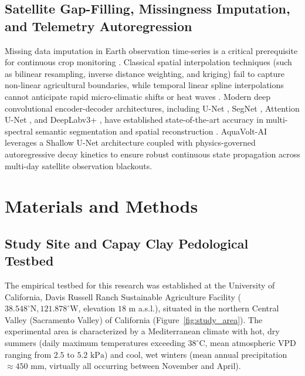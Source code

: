 \documentclass[sn-mathphys-num,Numbered]{sn-jnl}
\begin{document}
\subsection{Satellite Gap-Filling, Missingness Imputation, and Telemetry Autoregression}\label{sec:related_gap_filling}
Missing data imputation in Earth observation time-series is a critical prerequisite for continuous crop monitoring \cite{Zhang2016}. Classical spatial interpolation techniques (such as bilinear resampling, inverse distance weighting, and kriging) fail to capture non-linear agricultural boundaries, while temporal linear spline interpolations cannot anticipate rapid micro-climatic shifts or heat waves \cite{Chicco2021,Willmott1981,Nash1970,Zargar2011,VicenteSerrano2010}. Modern deep convolutional encoder-decoder architectures, including U-Net \cite{Ronneberger2015}, SegNet \cite{Badrinarayanan2017}, Attention U-Net \cite{Oktay2018}, and DeepLabv3+ \cite{Chen2018Encoder}, have established state-of-the-art accuracy in multi-spectral semantic segmentation and spatial reconstruction \cite{Isola2017}. AquaVolt-AI leverages a Shallow U-Net architecture coupled with physics-governed autoregressive decay kinetics to ensure robust continuous state propagation across multi-day satellite observation blackouts.

\section{Materials and Methods}\label{sec:methods}

\subsection{Study Site and Capay Clay Pedological Testbed}\label{sec:methods_site}
The empirical testbed for this research was established at the University of California, Davis Russell Ranch Sustainable Agriculture Facility ($38.548^\circ\text{N}, 121.878^\circ\text{W}$, elevation $18\text{ m}$ a.s.l.), situated in the northern Central Valley (Sacramento Valley) of California (Figure~\ref{fig:study_area}). The experimental area is characterized by a Mediterranean climate with hot, dry summers (daily maximum temperatures exceeding $38^\circ\text{C}$, mean atmospheric VPD ranging from $2.5\text{ to }5.2\text{ kPa}$) and cool, wet winters (mean annual precipitation $\approx 450\text{ mm}$, virtually all occurring between November and April). 
\end{document}
